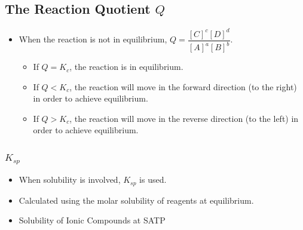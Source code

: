 \documentclass{article}
\begin{document}
\subsection{The Reaction Quotient $Q$}

\begin{itemize}
    \item When the reaction is not in equilibrium, $Q = \dfrac{[C]^c [D]^d}{[A]^a [B]^b}$.
    \begin{itemize}
        \item If $Q = K_c$, the reaction is in equilibrium.
        \item If $Q < K_c$, the reaction will move in the forward direction (to the right) in order to achieve equilibrium.
        \item If $Q > K_c$, the reaction will move in the reverse direction (to the left) in order to achieve equilibrium. 
    \end{itemize}
\end{itemize}

\subsubsection{$K_{sp}$}


\begin{itemize}
    \item When solubility is involved, $K_{sp}$ is used.
    \item Calculated using the molar solubility of reagents at equilibrium.
    \item Solubility of Ionic Compounds at SATP
\end{itemize}

\begin{center}
\end{center}
\end{document}
